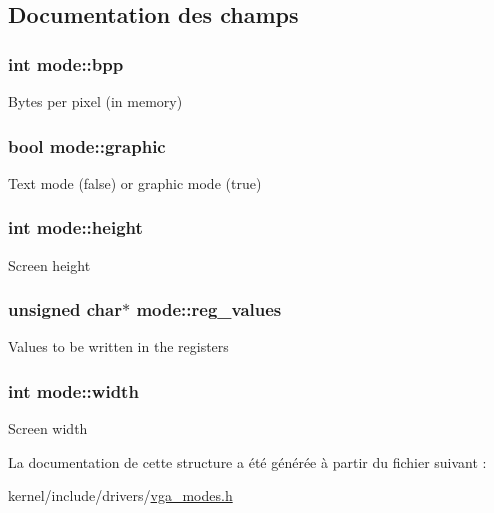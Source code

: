 \subsection{Documentation des champs}
\hypertarget{structmode_a5ca924aaa8f33c270e7896095df93c64}{
\subsubsection[{bpp}]{\setlength{\rightskip}{0pt plus 5cm}int mode\+::bpp}}\label{structmode_a5ca924aaa8f33c270e7896095df93c64}
Bytes per pixel (in memory) \hypertarget{structmode_a04810864c94405d05fdab5f4467a4db3}{
\subsubsection[{graphic}]{\setlength{\rightskip}{0pt plus 5cm}bool mode\+::graphic}}\label{structmode_a04810864c94405d05fdab5f4467a4db3}
Text mode (false) or graphic mode (true) \hypertarget{structmode_a5e0e1e7b517ffe3532d75bda4b47b2c4}{
\subsubsection[{height}]{\setlength{\rightskip}{0pt plus 5cm}int mode\+::height}}\label{structmode_a5e0e1e7b517ffe3532d75bda4b47b2c4}
Screen height \hypertarget{structmode_a704a184dc9d562c705d1feeb5be8788b}{
\subsubsection[{reg\+\_\+values}]{\setlength{\rightskip}{0pt plus 5cm}unsigned char$\ast$ mode\+::reg\+\_\+values}}\label{structmode_a704a184dc9d562c705d1feeb5be8788b}
Values to be written in the registers \hypertarget{structmode_ae3caae9e51730e3fc85ab1f7c9bfce89}{
\subsubsection[{width}]{\setlength{\rightskip}{0pt plus 5cm}int mode\+::width}}\label{structmode_ae3caae9e51730e3fc85ab1f7c9bfce89}
Screen width 

La documentation de cette structure a été générée à partir du fichier suivant \+:\begin{DoxyCompactItemize}
\item 
kernel/include/drivers/\hyperlink{vga__modes_8h}{vga\+\_\+modes.\+h}\end{DoxyCompactItemize}
